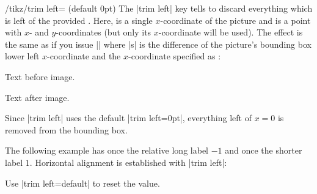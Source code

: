 \begin{key}{/tikz/trim left= (default 0pt)}
    The |trim left| key tells \pgfname\space to discard everything which is
    left of the provided . Here, 
    is a single $x$-coordinate of the picture and  is a point
    with $x$- and $y$-coordinates (but only its $x$-coordinate will be used).
    The effect is the same as if you issue |\hspace{-s}| where |s| is the
    difference of the picture's bounding box lower left $x$-coordinate and the
    $x$-coordinate specified as :
\begin{codeexample}[]
Text before image.%
Text after image.
\end{codeexample}
    Since |trim left| uses the default |trim left=0pt|, everything left of
    $x=0$ is removed from the bounding box.

    The following example has once the relative long label $-1$ and once the
    shorter label $1$. Horizontal alignment is established with |trim left|:
\begin{codeexample}[pre={\vbox\bgroup\hsize=5cm},post=\egroup,width=8cm]
\par
{}
\par
{}
\par
{}
\end{codeexample}

    Use |trim left=default| to reset the value.
\end{key}

